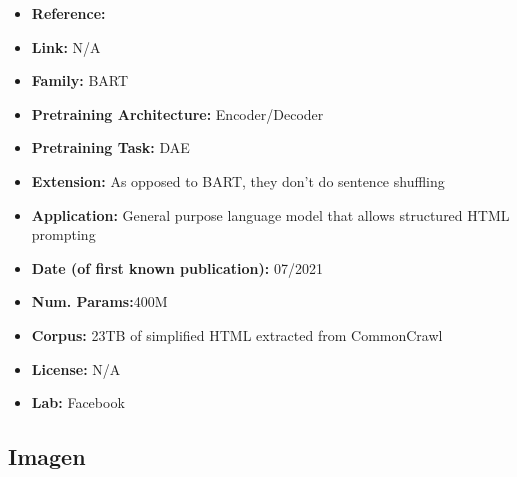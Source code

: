 \documentclass{article}
\begin{document}
            \begin{itemize}
                \item \textbf{Reference:} \href{https://arxiv.org/abs/2107.06955}{}
                \item \textbf{Link:} N/A
                \item \textbf{Family:} BART 
                \item \textbf{Pretraining Architecture:} Encoder/Decoder
                \item \textbf{Pretraining Task:} DAE
                \item \textbf{Extension:} As opposed to BART, they don’t do sentence shuffling  
                \item \textbf{Application:} General purpose language model that allows structured HTML prompting 
                \item \textbf{Date (of first known publication):} 07/2021
                \item \textbf{Num. Params:}400M
                \item \textbf{Corpus:} 23TB of simplified HTML extracted from CommonCrawl
                \item \textbf{License:} N/A
                \item \textbf{Lab:} Facebook
            \end{itemize}

\subsection{Imagen}
\end{document}
